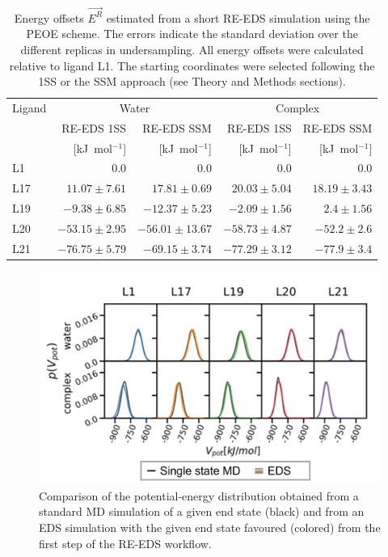 \begin{table}[h]
\caption{Energy offsets $\vec{E^R}$ estimated from a short RE-EDS simulation using the PEOE \cite{Sidler2016} scheme. The errors indicate the standard deviation over the different replicas in undersampling. All energy offsets were calculated relative to ligand L1. The starting coordinates were selected following the 1SS or the SSM approach (see Theory and Methods sections).}
\label{tab:CHK1_set2_Eoff}
\centering
\begin{adjustbox}{max width=\textwidth}
\begin{tabular}{ l | r r | r r }
 Ligand & \multicolumn{2}{c|}{Water}&\multicolumn{2}{c}{Complex}  \\ 
  &RE-EDS 1SS &RE-EDS SSM &RE-EDS 1SS &RE-EDS SSM \\ 
  & [kJ~mol$^{-1}$]& [kJ~mol$^{-1}$]& [kJ~mol$^{-1}$]& [kJ~mol$^{-1}$]\\
 \hline
     L1 & $0.0$ & $0.0$ & $0.0$ & $0.0$ \\ 
     L17 & $11.07 \pm 7.61 $ & $17.81 \pm 0.69 $ & $20.03 \pm 5.04 $ & $18.19 \pm 3.43$ \\
     L19 & $-9.38 \pm 6.85 $ & $ -12.37 \pm 5.23 $ & $-2.09 \pm 1.56 $ & $ 2.4 \pm 1.56$ \\
     L20 & $-53.15 \pm 2.95 $ & $ -56.01 \pm 13.67 $ & $ -58.73 \pm 4.87 $ & $-52.2 \pm 2.6$\\
     L21 & $-76.75 \pm 5.79 $& $-69.15 \pm 3.74 $ & $ -77.29 \pm 3.12 $ & $ -77.9 \pm 3.4$\\
\end{tabular}
\end{adjustbox}
\end{table}

\begin{figure}[h]
\centering
     \includegraphics[width=\textwidth]{fig/results/ringOpening/paramExploration/single_state_energy_sampling.png}
    \caption{Comparison of the potential-energy distribution obtained from a standard MD simulation of a given end state (black) and from an EDS simulation with the given end state favoured (colored) from the first step of the RE-EDS workflow.}
     \label{fig:CHK1_set2_stateOptimization_EnergyDistribution}
\end{figure}


